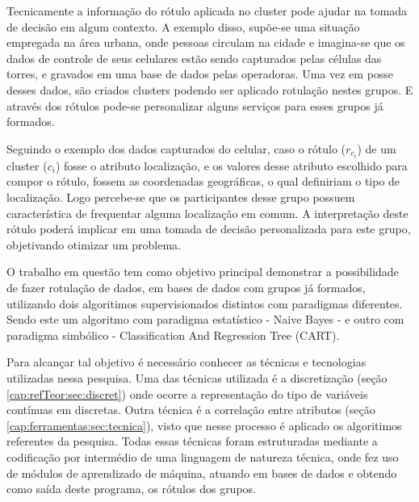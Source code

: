 Tecnicamente a informação do rótulo aplicada no cluster pode ajudar na tomada de decisão em algum contexto. A exemplo disso, supõe-se uma situação empregada na área urbana, onde pessoas circulam na cidade e imagina-se que os dados de controle de seus celulares estão sendo capturados pelas células das torres, e gravados em uma base de dados pelas operadoras. Uma vez em posse desses dados, são criados clusters podendo ser aplicado rotulação nestes grupos. E através dos rótulos pode-se personalizar alguns serviços para esses grupos já formados. 

Seguindo o exemplo dos dados capturados do celular, caso o rótulo (${r_{c_i}}$) de um cluster (${c_i}$) fosse o  atributo localização, e os valores  desse atributo escolhido para compor o rótulo, fossem as coordenadas geográficas, o qual definiriam o tipo de localização. Logo percebe-se que os participantes desse grupo possuem característica de frequentar alguma localização em comum. A interpretação deste rótulo poderá implicar em uma tomada de decisão personalizada para este grupo, objetivando otimizar um problema.

O trabalho em questão tem como objetivo principal demonstrar a  possibilidade de fazer rotulação de dados, em bases de dados com grupos já formados, utilizando dois algoritimos supervisionados distintos com paradigmas diferentes. Sendo este um algoritmo com paradigma estatístico - Naive Bayes -  e outro com paradigma simbólico - Classification And Regression Tree (CART).
 

Para alcançar tal objetivo é necessário conhecer as técnicas e tecnologias utilizadas nessa pesquisa. Uma das técnicas utilizada é a discretização (seção \ref{cap:refTeor:sec:discret}) onde ocorre a representação do tipo de variáveis contínuas em discretas. Outra técnica é a correlação entre atributos (seção \ref{cap:ferramentas:sec:tecnica}), visto que nesse processo é aplicado os algoritimos referentes da pesquisa. Todas essas técnicas foram estruturadas mediante a codificação por intermédio de uma linguagem de natureza técnica, onde fez uso de módulos de aprendizado de máquina, atuando em bases de dados e obtendo como saída deste programa, os rótulos dos grupos. 

